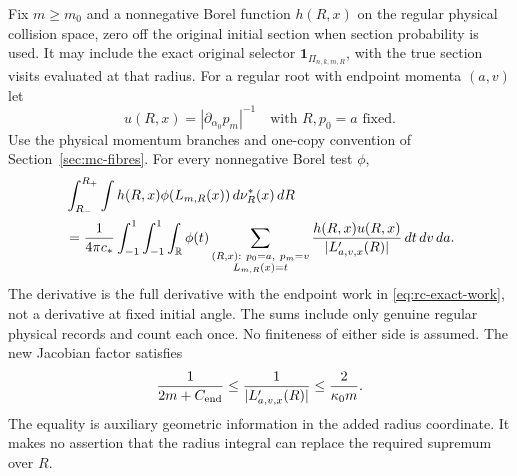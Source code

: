 \begin{theorem}
\label{thm:rc-disintegration}
Fix $m\geq m_0$ and a nonnegative Borel function $h(R,x)$ on the
regular physical collision space, zero off the original initial
section when section probability is used.  It may include the exact
original selector $\mathbf1_{\Pi_{n,k,m,R}}$, with the true section
visits evaluated at that radius.  For a regular root with endpoint
momenta $(a,v)$ let
\[
 u(R,x)=\left|\partial_{\alpha_0}p_m\right|^{-1}
        \quad\text{with $R,p_0=a$ fixed}.
\]
Use the physical momentum branches and one-copy convention of
Section~\ref{sec:mc-fibres}.  For every nonnegative Borel test $\phi$,
\begin{equation}\label{eq:rc-disintegration}
 \begin{split}
 &\int_{R_-}^{R_+}\int
       h(R,x)\phi(L_{m,R}(x))\,d\nu_R^*(x)\,dR\\
 &=\frac1{4\pi c_*}\int_{-1}^1\int_{-1}^1\int_{\mathbb R}
       \phi(t)
       \sum_{\substack{(R,x):\ p_0=a,\ p_m=v\\L_{m,R}(x)=t}}
       \frac{h(R,x)u(R,x)}{|L'_{a,v,x}(R)|}\,dt\,dv\,da .
 \end{split}
\end{equation}
The derivative is the full derivative with the endpoint work in
\eqref{eq:rc-exact-work}, not a derivative at fixed initial angle.
The sums include only genuine regular physical records and count
each once.  No finiteness of either side is assumed.  The new
Jacobian factor satisfies
\begin{equation}\label{eq:rc-jacobian-bounds}
 \frac1{2m+C_{\rm end}}
  \leq\frac1{|L'_{a,v,x}(R)|}\leq\frac2{\kappa_0m}.
\end{equation}
The equality is auxiliary geometric information in the added radius
coordinate.  It makes no assertion that the radius integral can
replace the required supremum over $R$.
\end{theorem}
